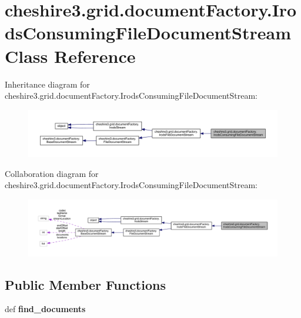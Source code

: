 \hypertarget{classcheshire3_1_1grid_1_1document_factory_1_1_irods_consuming_file_document_stream}{\section{cheshire3.\-grid.\-document\-Factory.\-Irods\-Consuming\-File\-Document\-Stream Class Reference}
\label{classcheshire3_1_1grid_1_1document_factory_1_1_irods_consuming_file_document_stream}
}


Inheritance diagram for cheshire3.\-grid.\-document\-Factory.\-Irods\-Consuming\-File\-Document\-Stream\-:
\nopagebreak
\begin{figure}[H]
\begin{center}
\leavevmode
\includegraphics[width=350pt]{classcheshire3_1_1grid_1_1document_factory_1_1_irods_consuming_file_document_stream__inherit__graph}
\end{center}
\end{figure}


Collaboration diagram for cheshire3.\-grid.\-document\-Factory.\-Irods\-Consuming\-File\-Document\-Stream\-:
\nopagebreak
\begin{figure}[H]
\begin{center}
\leavevmode
\includegraphics[width=350pt]{classcheshire3_1_1grid_1_1document_factory_1_1_irods_consuming_file_document_stream__coll__graph}
\end{center}
\end{figure}
\subsection*{Public Member Functions}
\begin{DoxyCompactItemize}
\item 
\hypertarget{classcheshire3_1_1grid_1_1document_factory_1_1_irods_consuming_file_document_stream_aae5828aa2fe5511e1119e2b8cdcc68cf}{def {\bfseries find\-\_\-documents}}\label{classcheshire3_1_1grid_1_1document_factory_1_1_irods_consuming_file_document_stream_aae5828aa2fe5511e1119e2b8cdcc68cf}

\end{DoxyCompactItemize}
